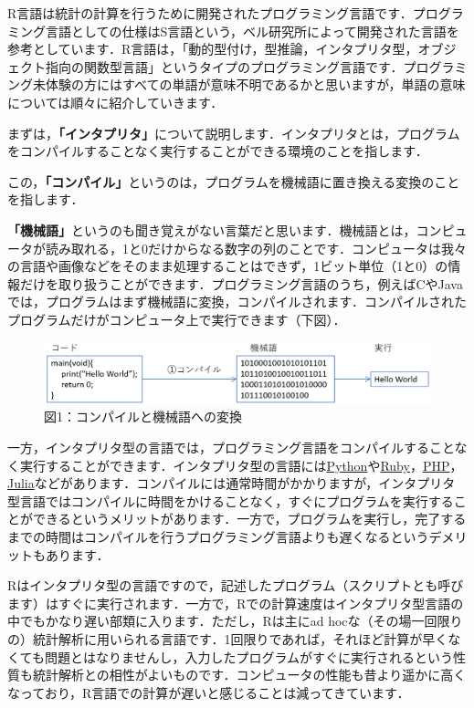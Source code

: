 \documentclass[
  letterpaper,
  DIV=11,
  numbers=noendperiod]{scrreprt}
\begin{document}
R言語は統計の計算を行うために開発されたプログラミング言語です．プログラミング言語としての仕様はS言語という，ベル研究所によって開発された言語を参考としています．R言語は，「動的型付け，型推論，インタプリタ型，オブジェクト指向の関数型言語」というタイプのプログラミング言語です．プログラミング未体験の方にはすべての単語が意味不明であるかと思いますが，単語の意味については順々に紹介していきます．

まずは，\textbf{「インタプリタ」}について説明します．インタプリタとは，プログラムをコンパイルすることなく実行することができる環境のことを指します．

この，\textbf{「コンパイル」}というのは，プログラムを機械語に置き換える変換のことを指します．

\textbf{「機械語」}というのも聞き覚えがない言葉だと思います．機械語とは，コンピュータが読み取れる，1と0だけからなる数字の列のことです．コンピュータは我々の言語や画像などをそのまま処理することはできず，1ビット単位（1と0）の情報だけを取り扱うことができます．プログラミング言語のうち，例えばCやJavaでは，プログラムはまず機械語に変換，コンパイルされます．コンパイルされたプログラムだけがコンピュータ上で実行できます（下図）．

\begin{figure}

{\centering \includegraphics{././image/compile.png}

}

\caption{図1：コンパイルと機械語への変換}

\end{figure}

一方，インタプリタ型の言語では，プログラミング言語をコンパイルすることなく実行することができます．インタプリタ型の言語には\href{https://www.python.org/}{Python}や\href{https://www.ruby-lang.org/ja/}{Ruby}，\href{https://www.php.net/}{PHP}，\href{https://julialang.org/}{Julia}などがあります．コンパイルには通常時間がかかりますが，インタプリタ型言語ではコンパイルに時間をかけることなく，すぐにプログラムを実行することができるというメリットがあります．一方で，プログラムを実行し，完了するまでの時間はコンパイルを行うプログラミング言語よりも遅くなるというデメリットもあります．

Rはインタプリタ型の言語ですので，記述したプログラム（スクリプトとも呼びます）はすぐに実行されます．一方で，Rでの計算速度はインタプリタ型言語の中でもかなり遅い部類に入ります．ただし，Rは主にad
hocな（その場一回限りの）統計解析に用いられる言語です．1回限りであれば，それほど計算が早くなくても問題とはなりませんし，入力したプログラムがすぐに実行されるという性質も統計解析との相性がよいものです．コンピュータの性能も昔より遥かに高くなっており，R言語での計算が遅いと感じることは減ってきています．
\end{document}

